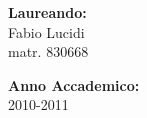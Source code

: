 \begin{titlepage}
\begin{flushleft}
\end{flushleft}
\vspace*{1.0cm}
\begin{flushright}

{\bfseries Laureando:} \\ Fabio Lucidi \\ matr. 830668 \\ 
		       
\end{flushright}
\vspace*{0.5cm}
\begin{flushright}

{\bfseries Anno Accademico:} \\ 2010-2011
\end{flushright} \clearpage
\end{titlepage}


